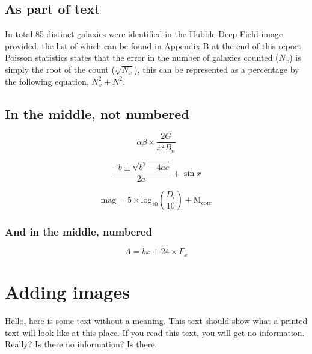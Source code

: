 \documentclass{article}
\begin{document}
\subsection{As part of text}

In total 85 distinct galaxies were identified in the Hubble Deep Field image provided, the list of which can be found in Appendix B at the end of this report. Poisson statistics states that the error in the number of galaxies counted ($N_x$) is simply the root of the count ($\sqrt{N_x}$), this can be represented as a percentage by the following equation, $N_x^2 + N^2$.

\subsection{In the middle, not numbered} 

$$ \alpha \beta \times \frac{2G}{x^2B_n}$$

$$ \frac{-b \pm \sqrt{b^2-4ac}}{2a} + \sin{x}$$

$$ \mathrm{mag} = 5 \times \mathrm{log}_{10}\left(\frac{D_{l}}{10}\right) + \mathrm{M_{corr}}$$

\subsubsection{And in the middle, numbered}
\begin{equation}
    A=bx+24\times F_x
    \label{eq:lovely formula}
\end{equation}

\section{Adding images}
Hello, here is some text without a meaning.  This text should show what a printed text will look like at this place. If you read this text, you will get no information.  Really?  Is there no information?  Is there.


\lipsum[7]
\end{document}

